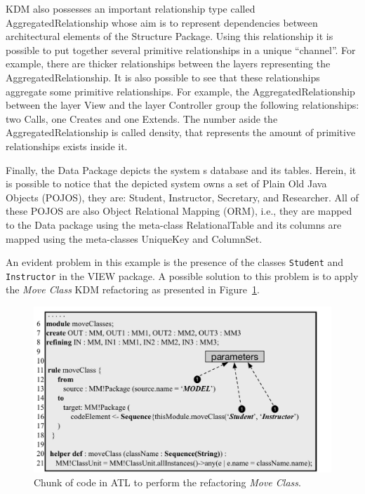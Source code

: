 KDM also possesses an important relationship type called AggregatedRelationship whose aim is to represent dependencies between architectural elements of the Structure Package. Using this relationship it is possible to put together several primitive relationships in a unique ``channel''. For example, there are thicker relationships between the layers representing the AggregatedRelationship. It is also possible to see that these relationships aggregate some primitive relationships. For example, the AggregatedRelationship between the layer View and the layer Controller group the following relationships: two Calls, one Creates and one Extends. The number aside the AggregatedRelationship is called density, that represents the amount of primitive relationships exists inside it.

Finally, the Data Package depicts the system s database and its tables. Herein, it is possible to notice that the depicted system owns a set of Plain Old Java Objects (POJOS), they are: Student, Instructor, Secretary, and Researcher. All of these POJOS are also Object Relational Mapping (ORM), i.e., they are mapped to the Data package using the meta-class RelationalTable and its columns are mapped using the meta-classes UniqueKey and ColumnSet.

An evident problem in this example is the presence of the classes \texttt{Student} and \texttt{Instructor} in the VIEW package. A possible solution to this problem is to apply the \textit{Move Class} KDM refactoring as presented in Figure~\ref{fig:ATLRefactoring}.

\begin{figure}[h]
	\centering
	\includegraphics[scale=0.516]{figuras/moveClassRefactoringFormatted}
	\caption{Chunk of code in ATL to perform the refactoring \textit{Move Class}.}
	\label{fig:ATLRefactoring}
\end{figure}

